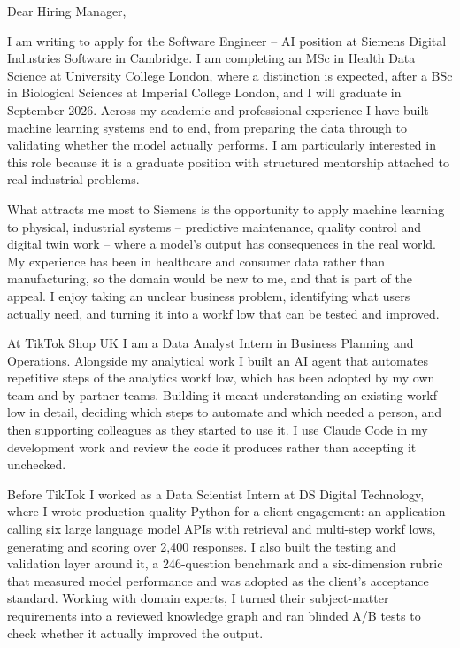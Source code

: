 \documentclass[letterpaper,11pt]{article}
\begin{document}
Dear Hiring Manager,

I am writing to apply for the Software Engineer -- AI position at Siemens Digital Industries Software in Cambridge. I am completing an MSc in Health Data Science at University College London, where a distinction is expected, after a BSc in Biological Sciences at Imperial College London, and I will graduate in September 2026. Across my academic and professional experience I have built machine learning systems end to end, from preparing the data through to validating whether the model actually performs. I am particularly interested in this role because it is a graduate position with structured mentorship attached to real industrial problems.

What attracts me most to Siemens is the opportunity to apply machine learning to physical, industrial systems -- predictive maintenance, quality control and digital twin work -- where a model's output has consequences in the real world. My experience has been in healthcare and consumer data rather than manufacturing, so the domain would be new to me, and that is part of the appeal. I enjoy taking an unclear business problem, identifying what users actually need, and turning it into a workf\kern0pt low that can be tested and improved.

At TikTok Shop UK I am a Data Analyst Intern in Business Planning and Operations. Alongside my analytical work I built an AI agent that automates repetitive steps of the analytics workf\kern0pt low, which has been adopted by my own team and by partner teams. Building it meant understanding an existing workf\kern0pt low in detail, deciding which steps to automate and which needed a person, and then supporting colleagues as they started to use it. I use Claude Code in my development work and review the code it produces rather than accepting it unchecked.

Before TikTok I worked as a Data Scientist Intern at DS Digital Technology, where I wrote production-quality Python for a client engagement: an application calling six large language model APIs with retrieval and multi-step workf\kern0pt lows, generating and scoring over 2,400 responses. I also built the testing and validation layer around it, a 246-question benchmark and a six-dimension rubric that measured model performance and was adopted as the client's acceptance standard. Working with domain experts, I turned their subject-matter requirements into a reviewed knowledge graph and ran blinded A/B tests to check whether it actually improved the output.
\end{document}
